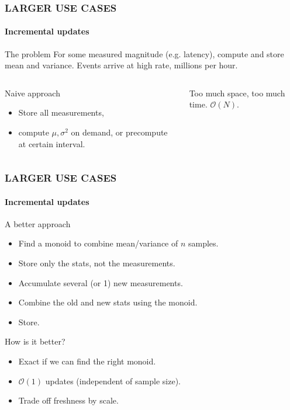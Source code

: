 \documentclass{beamer}
\begin{document}
\begin{frame} \frametitle{LARGER USE CASES}
  \framesubtitle{Incremental updates}
  \begin{block}{The problem}
    For some measured magnitude (e.g. latency), \alert{compute} and store \alert{mean} and
    \alert{variance.} Events arrive at high rate, \alert{millions per hour.}
  \end{block} \pause
  \begin{columns}[c]
      \begin{block}{Naive approach}
        \begin{itemize}
        \item Store all measurements,
        \item compute \(\mu, \sigma^2\) on demand, or
          precompute at certain interval.
        \end{itemize}
      \end{block}

  Too much \alert{space}, too much \alert{time}. \(\mathcal{O}(N)\).
  \end{columns}
\end{frame}

\begin{frame} \frametitle{LARGER USE CASES}
  \framesubtitle{Incremental updates}
  \begin{block}{A better approach}
  \begin{itemize}
    \item Find a \alert{monoid} to combine \alert{mean/variance} of \(n\) samples.
    \item Store only the stats, not the measurements.
    \item Accumulate several (or 1) new measurements.
    \item \alert{Combine} the old and new stats using the monoid.
    \item Store.
  \end{itemize}
  \end{block}

  \begin{block}{How is it better?}
  \begin{itemize}
    \item \alert{Exact} if we can find the right monoid.
    \item \alert{\(\mathcal{O}(1)\) updates} (independent of sample size).
    \item Trade off freshness by scale.
  \end{itemize}
  \end{block}
\end{frame}
\end{document}
